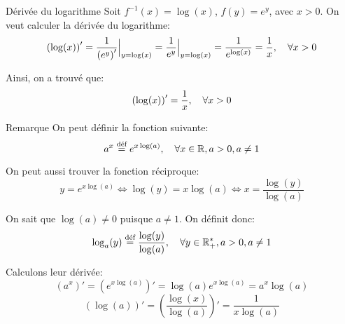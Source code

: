 \documentclass[a4paper]{article}
\begin{document}
\begin{parag}{Dérivée du logarithme}
    Soit $f^{-1}\left(x\right) = \log\left(x\right)$, $f\left(y\right) = e^y$, avec $x > 0$. On veut calculer la dérivée du logarithme: 
    \[\left(\log\left(x\right)\right)' = \frac{1}{\left(e^y\right)'} \eval_{y = \log\left(x\right)}^{} = \frac{1}{e^y} \eval_{y = \log\left(x\right)}^{} = \frac{1}{e^{\log\left(x\right)}} = \frac{1}{x}, \mathspace \forall x > 0\]
    
    Ainsi, on a trouvé que: 
    \[\left(\log\left(x\right)\right)' = \frac{1}{x}, \mathspace \forall x > 0\]
\end{parag}

\begin{parag}{Remarque}
    On peut définir la fonction suivante: 
    \[a^x \over{=}{déf} e^{x \log\left(a\right)}, \mathspace \forall x \in \mathbb{R}, a > 0, a \neq 1\]
    
    On peut aussi trouver la fonction réciproque: 
    \[y = e^{x \log\left(a\right)} \iff \log\left(y\right) = x \log\left(a\right) \iff x = \frac{\log\left(y\right)}{\log\left(a\right)}\]
    
    On sait que $\log\left(a\right) \neq 0$ puisque $a \neq 1$. On définit donc: 
    \[\log_a\left(y\right) \over{=}{déf} \frac{\log\left(y\right)}{\log\left(a\right)}, \mathspace \forall y \in \mathbb{R}^*_+, a > 0, a \neq 1\]


    Calculons leur dérivée: 
    \[\left(a^x\right)' = \left(e^{x \log\left(a\right)}\right)' = \log\left(a\right) e^{x \log\left(a\right)} = a^x\log\left(a\right)\]
    \[\left(\log\left(a\right)\right)' = \left(\frac{\log\left(x\right)}{\log\left(a\right)}\right)' = \frac{1}{x\log\left(a\right)}\]
\end{parag}
\end{document}
